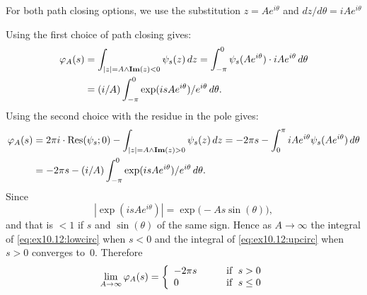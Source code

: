 \begin{enumerate}
For both path closing options, we use the substitution \(z = Ae^{i\theta}\)
and \(dz/d\theta = iAe^{i\theta}\)

Using the first choice of path closing gives:
\begin{align}
\varphi_A(s) 
&= \int_{|z|=A \wedge \Im(z)<0} \psi_s(z)\,dz
 = \int_{-\pi}^0 \psi_s(Ae^{i\theta}) \cdot iAe^{i\theta} \,d\theta \notag \\
&= (i/A) \int_{-\pi}^0 \exp(isAe^{i\theta})/e^{i\theta}\,d\theta.
   \label{eq:ex10.12:lowcirc}
\end{align}
Using the second choice with the residue in the pole gives:
\begin{align}
\varphi_A(s) 
&= 2\pi i\cdot \Res(\psi_s;0) - \int_{|z|=A \wedge \Im(z)>0} \psi_s(z)\,dz
 = -2\pi s - \int_0^\pi iAe^{i\theta} \psi_s(Ae^{i\theta})\,d\theta \notag \\
&= -2\pi s - (i/A) \int_{-\pi}^0 \exp(isAe^{i\theta})/e^{i\theta}\,d\theta.
   \label{eq:ex10.12:upcirc}
\end{align}
Since
\begin{equation*}
\left|\exp(isAe^{i\theta})\right| = \exp\bigl(-As\sin(\theta)\bigr),
\end{equation*}
and that is \(<1\) if $s$ and \(\sin(\theta)\) of the same sign.
Hence as \(A\to\infty\)
the integral of \eqref{eq:ex10.12:lowcirc} when \(s<0\)
and the integral of \eqref{eq:ex10.12:upcirc} when \(s>0\)
converges to~$0$.
Therefore
\begin{equation}
\lim_{A\to\infty} \varphi_A(s) = 
 \left\{\begin{array}{ll}%
 -2\pi s \qquad & \textnormal{if\ }\; s > 0\\
 0       \qquad & \textnormal{if\ }\; s \leq 0
 \end{array}
 \right. \label{eq:10.12:varphiA}
\end{equation}

\iffalse
We compute the rational integral term of \eqref{eq:10.12:sin2phis}.
Within the real axis
\begin{equation*}
\int_{\R\setminus(-1,1)} \frac{dx}{x^2} 
 = 2\int_1^{\infty} x^{-2}\,dx 
 = 2\left(-x^{-1}\right)\bigm|_1^\infty = 2\bigl(0-(-1)\bigr)=2
 \end{equation*}
and within the arc part
\begin{align*}
\int_{-\pi}^0 e^{-2i\theta}\frac{dz}{d\theta}\,d\theta 
&= i \int_{-\pi}^0 e^{-2i\theta}\cdot e^{i\theta}\,d\theta 
 = i \int_{-\pi}^0 e^{-i\theta}\,d\theta
 = i\left.\left(\frac{1}{-i}e^{-i\theta}\right)\right|_{-\pi}^0 \\
&= -\left.e^{-i\theta}\right|_{-\pi}^0 = %
   -\bigl(1 - (-1)\bigr) = -2
\end{align*}
Adding to:
\begin{equation}
\int_{\Gamma_A} \frac{dz}{z^2}
 = \int_{\R\setminus(-1,1)} \frac{dx}{x^2} 
   + \int_{-\pi}^0 \exp(isAe^{i\theta})e^{i\theta}\,d\theta \\
 = 2 - 2 = 0 \label{eq:10.12:intrat}
\end{equation}
\fi %


\end{enumerate}
